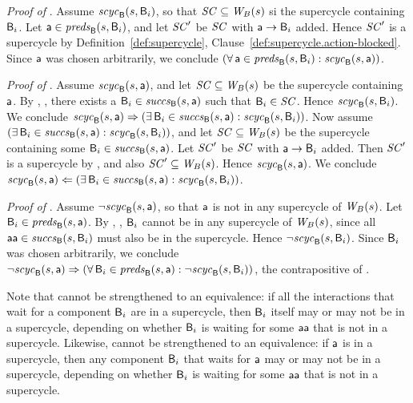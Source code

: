 \textit{Proof of }.
%
Assume $\mathit{scyc}_{\mathsf{B}}({s, \mathsf{B}_i})$, so that $\mathit{SC} \subseteq \mathit{W}_{B}({s})$ si the supercycle containing $\mathsf{B}_i$.
Let  $\mathsf{a} \in \mathit{preds}_{\mathsf{B}}({s, \mathsf{B}_i})$, and let $\mathit{SC}'$ be $\mathit{SC}$ with 
$\mathsf{a} \rightarrow \mathsf{B}_i$ added. Hence $\mathit{SC}'$ is a supercycle 
by Definition~\ref{def:supercycle},
  Clause~\ref{def:supercycle.action-blocked}.
Since $\mathsf{a}$ was chosen arbitrarily, we conclude 
$(\forall\, \mathsf{a} \in \mathit{preds}_{\mathsf{B}}({s, \mathsf{B}_i}) : \mathit{scyc}_{\mathsf{B}}({s, \mathsf{a}}))$.



\textit{Proof of }.
%
Assume $\mathit{scyc}_{\mathsf{B}}({s, \mathsf{a}})$, and let $\mathit{SC} \subseteq \mathit{W}_{B}({s})$ be the supercycle containing $\mathsf{a}$.  By
, , there exists a
$\mathsf{B}_i \in \mathit{succs}_{\mathsf{B}}({s, \mathsf{a}})$ such that $\mathsf{B}_i \in \mathit{SC}$.  Hence $\mathit{scyc}_{\mathsf{B}}({s, \mathsf{B}_i})$.
We conclude
$\mathit{scyc}_{\mathsf{B}}({s, \mathsf{a}}) \Rightarrow (\exists\, \mathsf{B}_i \in \mathit{succs}_{\mathsf{B}}({s, \mathsf{a}}) : \mathit{scyc}_{\mathsf{B}}({s, \mathsf{B}_i}))$.
%
Now assume $(\exists\, \mathsf{B}_i \in \mathit{succs}_{\mathsf{B}}({s, \mathsf{a}}) : \mathit{scyc}_{\mathsf{B}}({s, \mathsf{B}_i}))$, and let 
$\mathit{SC} \subseteq \mathit{W}_{B}({s})$ be the supercycle containing some $\mathsf{B}_i \in \mathit{succs}_{\mathsf{B}}({s, \mathsf{a}})$. 
Let $\mathit{SC}'$ be $\mathit{SC}$ with $\mathsf{a} \rightarrow \mathsf{B}_i$ added. Then $\mathit{SC}'$ is a supercycle by 
, and also $\mathit{SC}' \subseteq \mathit{W}_{B}({s})$. Hence $\mathit{scyc}_{\mathsf{B}}({s, \mathsf{a}})$.
We conclude 
$\mathit{scyc}_{\mathsf{B}}({s, \mathsf{a}}) \Leftarrow (\exists\, \mathsf{B}_i \in \mathit{succs}_{\mathsf{B}}({s, \mathsf{a}}) : \mathit{scyc}_{\mathsf{B}}({s, \mathsf{B}_i}))$.


\textit{Proof of }.  
%
Assume $\neg \mathit{scyc}_{\mathsf{B}}({s, \mathsf{a}})$, so that $\mathsf{a}$ is not in any supercycle of $\mathit{W}_{B}({s})$.
Let $\mathsf{B}_i \in \mathit{preds}_{\mathsf{B}}({s, \mathsf{a}})$. 
By , , 
$\mathsf{B}_i$ cannot be in any supercycle of $\mathit{W}_{B}({s})$, since all $\mathsf{aa} \in \mathit{succs}_{\mathsf{B}}({s, \mathsf{B}_i})$ must
also be in the supercycle. Hence $\neg \mathit{scyc}_{\mathsf{B}}({s, \mathsf{B}_i})$.
Since $\mathsf{B}_i$ was chosen arbitrarily, we conclude
$\neg \mathit{scyc}_{\mathsf{B}}({s, \mathsf{a}}) \Rightarrow  (\forall\, \mathsf{B}_i \in \mathit{preds}_{\mathsf{B}}({s, \mathsf{a}}) : \neg \mathit{scyc}_{\mathsf{B}}({s, \mathsf{B}_i}))$, the
contrapositive of .  
\epr

Note that  cannot be strengthened to an equivalence: if all
the interactions that wait for a component $\mathsf{B}_i$ are in a supercycle, then $\mathsf{B}_i$ itself may or may
not be in a supercycle, depending on whether $\mathsf{B}_i$ is waiting for some $\mathsf{aa}$ that is not in a
supercycle.
%
Likewise,  cannot be strengthened to an equivalence: if $\mathsf{a}$
is in a supercycle, then any component $\mathsf{B}_i$ that waits for $\mathsf{a}$ may or may not be in a 
supercycle, depending on whether $\mathsf{B}_i$ is waiting for some $\mathsf{aa}$ that is not in a supercycle. 




